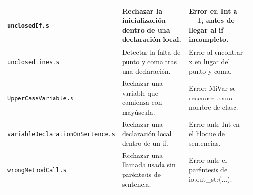 \begin{longtable}{|
>{\raggedright\arraybackslash}p{}|
>{\raggedright\arraybackslash}p{}|
>{\raggedright\arraybackslash}p{}|}
\texttt{unclosedIf\allowbreak .s} & Rechazar la inicialización dentro de una declaración local. & Error en Int a = 1; antes de llegar al if incompleto. \\ \hline
\texttt{unclosedLines\allowbreak .s} & Detectar la falta de punto y coma tras una declaración. & Error al encontrar x en lugar del punto y coma. \\ \hline
\texttt{UpperCaseVariable\allowbreak .s} & Rechazar una variable que comienza con mayúscula. & Error: MiVar se reconoce como nombre de clase. \\ \hline
\texttt{variableDeclarationOnSentence\allowbreak .s} & Rechazar una declaración local dentro de un if. & Error ante Int en el bloque de sentencias. \\ \hline
\texttt{wrongMethodCall\allowbreak .s} & Rechazar una llamada usada sin paréntesis de sentencia. & Error ante el paréntesis de io.out\_str(...). \\ \hline
\end{longtable}
\endgroup
